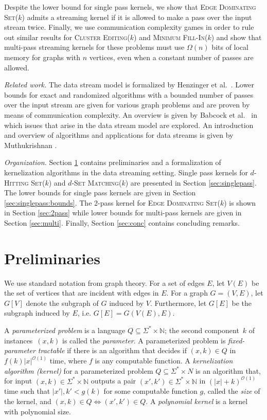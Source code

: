 \documentclass[draft,a4paper]{llncs}
\newcommand{\N}{\mathbb{N}}
\newcommand{\dHSk}{$d$-\textsc{Hitting Set($k$)}\xspace}
\newcommand{\dSMk}{$d$-\textsc{Set Matching($k$)}\xspace}
\newcommand{\EDSk}{\textsc{Edge Dominating Set($k$)}\xspace}
\newcommand{\CEk}{\textsc{Cluster Editing($k$)}\xspace}
\newcommand{\MFIk}{\textsc{Minimum Fill-In($k$)}\xspace}
\begin{document}
Despite the lower bound for single pass kernels, we show that \EDSk admits a streaming kernel if it is allowed to make a pass over the input stream twice. Finally, we use communication complexity games in order to rule out similar results for \CEk and \MFIk and show that multi-pass streaming kernels for these problems must use $\Omega(n)$ bits of local memory for graphs with $n$ vertices, even when a constant number of passes are allowed. 

\emph{Related work.} The data stream model is formalized by Henzinger et al.~\cite{raghavan1999computing}. Lower bounds for exact and randomized algorithms with a bounded number of passes over the input stream are given for various graph problems and are proven by means of communication complexity. An overview is given by Babcock et al.~\cite{babcock2002models} in which issues that arise in the data stream model are explored. An introduction and overview of algorithms and applications for data streams is given by Muthukrishnan \cite{muthukrishnan2005data}. 


\emph{Organization.} 
Section \ref{sec:prelim} contains preliminaries and a formalization of kernelization algorithms in the data streaming setting. Single pass kernels for \dHSk and \dSMk are presented in Section \ref{sec:singlepass}. The lower bounds for single pass kernels are given in Section \ref{sec:singlepass:bounds}. The 2-pass kernel for \EDSk is shown in Section \ref{sec:2pass} while lower bounds for multi-pass kernels are given in Section \ref{sec:multi}. Finally, Section \ref{sec:conc} contains concluding remarks.

\section{Preliminaries} \label{sec:prelim}
We use standard notation from graph theory. For a set of edges $E$, let $V(E)$ be the set of vertices that are 
incident with edges in $E$. For a graph $G=(V,E)$, let $G[V]$ denote the subgraph of $G$ induced by $V$.  Furthermore, let $G[E]$ be the subgraph induced by $E$, i.e. $G[E] = G(V(E), E)$. 

A \emph{parameterized problem} is a language $Q \subseteq \Sigma^* \times \N$;
the second component~$k$ of instances~$(x,k)$ is called the \emph{parameter}. 
A parameterized problem is \emph{fixed-parameter tractable} if there is an algorithm that decides if $(x, k) \in Q$ 
in $f(k)|x|^{\mathcal{O}(1)}$ time, where $f$ is any computable function. 
A \emph{kernelization algorithm (kernel)} for a parameterized problem $Q \subseteq \Sigma^* \times N$ is an algorithm that, for input $(x, k) \in \Sigma^* \times \N$ outputs a pair $(x', k') \in \Sigma^* \times \N$ in $(|x|+k)^{\mathcal{O}(1)}$ time such that $|x'|, k' < g(k)$ for some computable function $g$, called the \emph{size} of the kernel, and $(x, k) \in Q \Leftrightarrow (x', k') \in Q$. A \emph{polynomial kernel} is a kernel with polynomial size.
\end{document}
